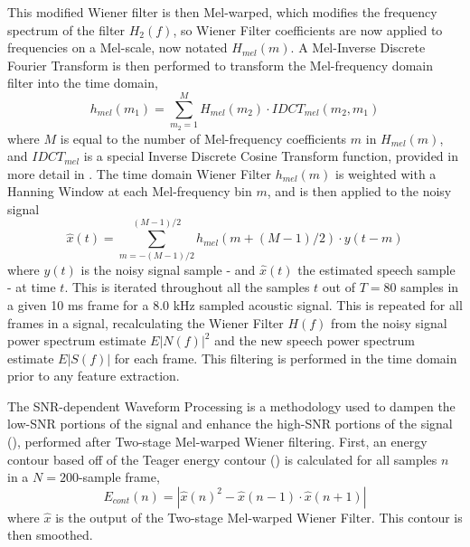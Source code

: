 This modified Wiener filter is then Mel-warped, which modifies the frequency spectrum of the filter $H_2(f)$, so Wiener Filter coefficients are now applied to frequencies on a Mel-scale, now notated $H_{mel}(m)$.  A Mel-Inverse Discrete Fourier Transform is then performed to transform the Mel-frequency domain filter into the time domain, \begin{equation} h_{mel}(m_1) = \sum_{m_2=1}^{M} H_{mel}(m_2) \cdot IDCT_{mel}(m_2,m_1) \end{equation} where $M$ is equal to the number of Mel-frequency coefficients $m$ in $H_{mel}(m)$, and $IDCT_{mel}$ is a special Inverse Discrete Cosine Transform function, provided in more detail in \cite{etsi:02}.  The time domain Wiener Filter $h_{mel}(m)$ is weighted with a Hanning Window at each Mel-frequency bin $m$, and is then applied to the noisy signal \begin{equation} \hat{x}(t) = \sum_{m=-(M-1)/2}^{(M-1)/2} h_{mel}(m+(M-1)/2) \cdot y(t-m) \end{equation} where $y(t)$ is the noisy signal sample - and $\hat{x}(t)$ the estimated speech sample - at time $t$.  This is iterated throughout all the samples $t$ out of $T=80$ samples in a given 10 ms frame for a 8.0 kHz sampled acoustic signal.  This is repeated for all frames in a signal, recalculating the Wiener Filter $H(f)$ from the noisy signal power spectrum estimate $E|N(f)|^2$ and the new speech power spectrum estimate $E|S(f)|$ for each frame.  This filtering is performed in the time domain prior to any feature extraction.

The SNR-dependent Waveform Processing is a methodology used to dampen the low-SNR portions of the signal and enhance the high-SNR portions of the signal (\cite{macho:01}), performed after Two-stage Mel-warped Wiener filtering.  First, an energy contour based off of the Teager energy contour (\cite{teager:80}) is calculated for all samples $n$ in a $N=200$-sample frame, \begin{equation} E_{cont}(n) = |\hat{x}(n)^2 - \hat{x}(n-1) \cdot \hat{x}(n+1)| \end{equation} where $\hat{x}$ is the output of the Two-stage Mel-warped Wiener Filter.  This contour is then smoothed.  

